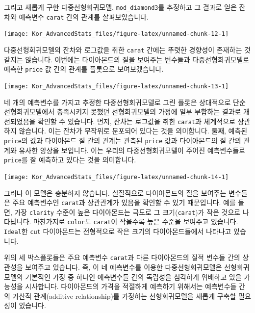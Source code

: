 \documentclass[
]{book}
\begin{document}
그리고 새롭게 구한 다중선형회귀모델, \texttt{mod\_diamond3}를 추정하고 그 결과로 얻은 잔차와 예측변수 \texttt{carat} 간의 관계를 살펴보았습니다.

\begin{center}\texttt{[image: Kor\_AdvancedStats\_files/figure-latex/unnamed-chunk-12-1]} \end{center}

다중선형회귀모델의 잔차와 로그값을 취한 \texttt{carat} 간에는 뚜렷한 경향성이 존재하는 것 같지는 않습니다. 이번에는 다이아몬드의 질을 보여주는 변수들과 다중선형회귀모델로 예측한 \texttt{price} 값 간의 관계를 플롯으로 보여보겠습니다.

\begin{center}\texttt{[image: Kor\_AdvancedStats\_files/figure-latex/unnamed-chunk-13-1]} \end{center}

네 개의 예측변수를 가지고 추정한 다중선형회귀모델로 그린 플롯은 상대적으로 단순선형회귀모델에서 충족시키지 못했던 선형회귀모델의 가정에 일부 부합하는 결과로 개선되었음을 확인할 수 있습니다. 먼저, 잔차는 로그값을 취한 \texttt{carat}과 체계적으로 상관하지 않습니다. 이는 잔차가 무작위로 분포되어 있다는 것을 의미합니다. 둘째, 예측된 \texttt{price}의 값과 다이아몬드 질 간의 관계는 관측된 \texttt{price} 값과 다이아몬드의 질 간의 관계와 유사한 양상을 보입니다. 이는 우리의 다중선형회귀모델이 주어진 예측변수들로 \texttt{price}를 잘 예측하고 있다는 것을 의미합니다.

\begin{center}\texttt{[image: Kor\_AdvancedStats\_files/figure-latex/unnamed-chunk-14-1]} \end{center}

그러나 이 모델은 충분하지 않습니다. 실질적으로 다이아몬드의 질을 보여주는 변수들은 주요 예측변수인 \texttt{carat}과 상관관계가 있음을 확인할 수 있기 때문입니다. 예를 들면, 가장 \texttt{clarity} 수준이 높은 다이아몬드는 극도로 그 크기(\texttt{carat})가 작은 것으로 나타납니다. 마찬가지로 \texttt{color}도 \texttt{carat}이 작을수록 높은 수준을 보여주고 있습니다. \texttt{Ideal}한 \texttt{cut} 다이아몬드는 전형적으로 작은 크기의 다이아몬드들에서 나타나고 있습니다.

위의 세 박스플롯들은 주요 예측변수 \texttt{carat}과 다른 다이아몬드의 질적 변수들 간의 상관성을 보여주고 있습니다. 즉, 이 네 예측변수를 이용한 다중선형회귀모델은 선형회귀모델의 기본적인 가정 중 하나인 예측변수들 간의 독립성을 심각하게 위배하고 있을 가능성을 시사합니다. 다이아몬드의 가격을 적절하게 예측하기 위해서는 예측변수들 간의 가산적 관계(additive relationship)를 가정하는 선형회귀모델을 새롭게 구축할 필요성이 있습니다.
\end{document}
